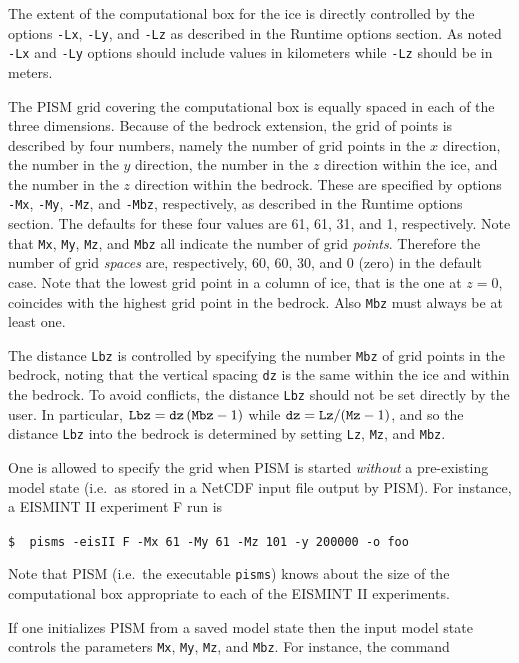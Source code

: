 \documentclass[12pt,final]{amsart}
\renewcommand{\t}[1]{\texttt{#1}}
\begin{document}
The extent of the computational box for the ice is directly controlled by the options \t{-Lx}, \t{-Ly}, and \t{-Lz} as described in the Runtime options section.  As noted \t{-Lx} and \t{-Ly} options should include values in kilometers while \t{-Lz} should be in meters.

The PISM grid covering the computational box is equally spaced in each of the three dimensions.  Because of the bedrock extension, the grid of points is described by four numbers, namely the number of grid points in the $x$ direction, the number in the $y$ direction, the number in the $z$ direction within the ice, and the number in the $z$ direction within the bedrock.  These are specified by options \verb|-Mx|, \verb|-My|, \verb|-Mz|, and \verb|-Mbz|, respectively, as described in the Runtime options section.  The defaults for these four values are 61, 61, 31, and 1, respectively.  Note that \verb|Mx|, \verb|My|, \verb|Mz|, and \verb|Mbz| all indicate the number of grid \emph{points}.  Therefore the number of grid \emph{spaces} are, respectively, 60, 60, 30, and 0 (zero) in the default case.  Note that the lowest grid point in a column of ice, that is the one at $z=0$, coincides with the highest grid point in the bedrock.  Also \verb|Mbz| must always be at least one.

The distance \t{Lbz} is controlled by specifying the number \verb|Mbz| of grid points in the bedrock, noting that the vertical spacing \t{dz} is the same within the ice and within the bedrock.  To avoid conflicts, the distance \t{Lbz} should not be set directly by the user.  In particular, $\text{\t{Lbz}}=\text{\t{dz}}\,(\text{\t{Mbz}}-1)$ while $\text{\t{dz}} = \text{\t{Lz}} / (\text{\t{Mz}}-1)$, and so the distance \t{Lbz} into the bedrock is determined by setting \t{Lz}, \t{Mz}, and \t{Mbz}.

One is allowed to specify the grid when PISM is started \emph{without} a pre-existing model state (i.e.~as stored in a NetCDF input file output by PISM).  For instance, a EISMINT II experiment F \cite{EISMINT00} run is

\verb|$  pisms -eisII F -Mx 61 -My 61 -Mz 101 -y 200000 -o foo|

\noindent Note that PISM (i.e.~the executable \verb|pisms|) knows about the size of the computational box appropriate to each of the EISMINT II experiments.

If one initializes PISM from a saved model state then the input model state controls the parameters \t{Mx}, \t{My}, \t{Mz}, and \t{Mbz}.  For instance, the command
\end{document}
